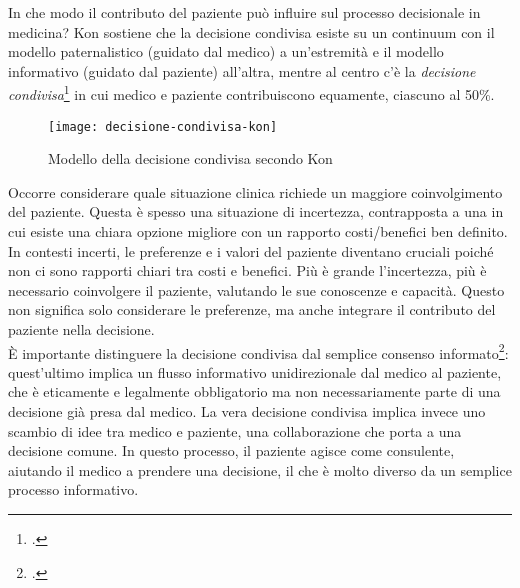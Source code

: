 In che modo il contributo del paziente può influire sul processo decisionale in medicina? Kon sostiene che la decisione condivisa esiste su un continuum con il modello paternalistico (guidato dal medico) a un'estremità e il modello informativo (guidato dal paziente) all'altra, mentre al centro c'è la \textit{decisione condivisa}\footcite{womak:decisione-condivisa-kon} in cui medico e paziente contribuiscono equamente, ciascuno al 50\%.\\


\begin{figure}[!ht] 
    \centering 
    \texttt{[image: decisione-condivisa-kon]} 
    \caption{Modello della decisione condivisa secondo Kon}
\end{figure}

Occorre considerare quale situazione clinica richiede un maggiore coinvolgimento del paziente. Questa è spesso una situazione di incertezza, contrapposta a una in cui esiste una chiara opzione migliore con un rapporto costi/benefici ben definito. In contesti incerti, le preferenze e i valori del paziente diventano cruciali poiché non ci sono rapporti chiari tra costi e benefici. Più è grande l'incertezza, più è necessario coinvolgere il paziente, valutando le sue conoscenze e capacità. Questo non significa solo considerare le preferenze, ma anche integrare il contributo del paziente nella decisione.\\

È importante distinguere la decisione condivisa dal semplice consenso informato\footcite{womak:recenti-progressi-medicina}: quest'ultimo implica un flusso informativo unidirezionale dal medico al paziente, che è eticamente e legalmente obbligatorio ma non necessariamente parte di una decisione già presa dal medico. La vera decisione condivisa implica invece uno scambio di idee tra medico e paziente, una collaborazione che porta a una decisione comune. In questo processo, il paziente agisce come consulente, aiutando il medico a prendere una decisione, il che è molto diverso da un semplice processo informativo.


